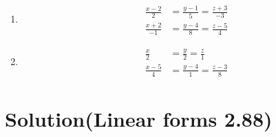 \begin{enumerate}[label=\alph*)]
    \item 
    \begin{align}
        \frac{x-2}{2}&=\frac{y-1}{5}=\frac{z+3}{-3}\\
       \frac{x+2}{-1}&=\frac{y-4}{8}=\frac{z-5}{4}
    \end{align}
    \item
    \begin{align}
        \frac{x}{2}&=\frac{y}{2}=\frac{z}{1}\\
        \frac{x-5}{4}&=\frac{y-4}{1}=\frac{z-3}{8}
    \end{align}
\end{enumerate}
\section{Solution(Linear forms 2.88)}
